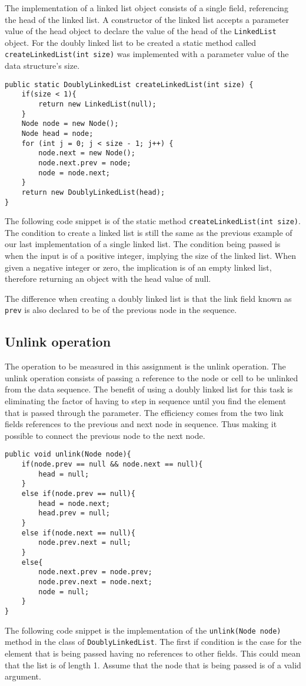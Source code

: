 \documentclass[a4paper,11pt]{article}
\begin{document}
        The implementation of a linked list object consists of a single field, referencing the head of the linked list. A constructor of the linked list accepts a parameter value of the head object to declare the value of the head of the \texttt{LinkedList} object. For the doubly linked list to be created a static method called \texttt{createLinkedList(int size)} was implemented with a parameter value of the data structure's size.
\begin{verbatim}
public static DoublyLinkedList createLinkedList(int size) {
    if(size < 1){
        return new LinkedList(null);
    }
    Node node = new Node();
    Node head = node;
    for (int j = 0; j < size - 1; j++) {
        node.next = new Node();
        node.next.prev = node;
        node = node.next;
    }
    return new DoublyLinkedList(head);
}
\end{verbatim}
        The following code snippet is of the static method \texttt{createLinkedList(int size)}. The condition to create a linked list is still the same as the previous example of our last implementation of a single linked list. The condition being passed is when the input is of a positive integer, implying the size of the linked list. When given a negative integer or zero, the implication is of an empty linked list, therefore returning an object with the head value of null. 
        
        The difference when creating a doubly linked list is that the link field known as \texttt{prev} is also declared to be of the previous node in the sequence.  

    \subsection*{Unlink operation}

        The operation to be measured in this assignment is the unlink operation. The unlink operation consists of passing a reference to the node or cell to be unlinked from the data sequence. The benefit of using a doubly linked list for this task is eliminating the factor of having to step in sequence until you find the element that is passed through the parameter. The efficiency comes from the two link fields references to the previous and next node in sequence. Thus making it possible to connect the previous node to the next node.
\begin{verbatim}
public void unlink(Node node){
    if(node.prev == null && node.next == null){
        head = null;
    }
    else if(node.prev == null){
        head = node.next;
        head.prev = null;
    }
    else if(node.next == null){
        node.prev.next = null;
    }
    else{
        node.next.prev = node.prev;
        node.prev.next = node.next;
        node = null;
    }
}
\end{verbatim}
        The following code snippet is the implementation of the \texttt{unlink(Node node)} method in the class of \texttt{DoublyLinkedList}. The first if condition is the case for the element that is being passed having no references to other fields. This could mean that the list is of length 1. Assume that the node that is being passed is of a valid argument.
        
\end{document}
